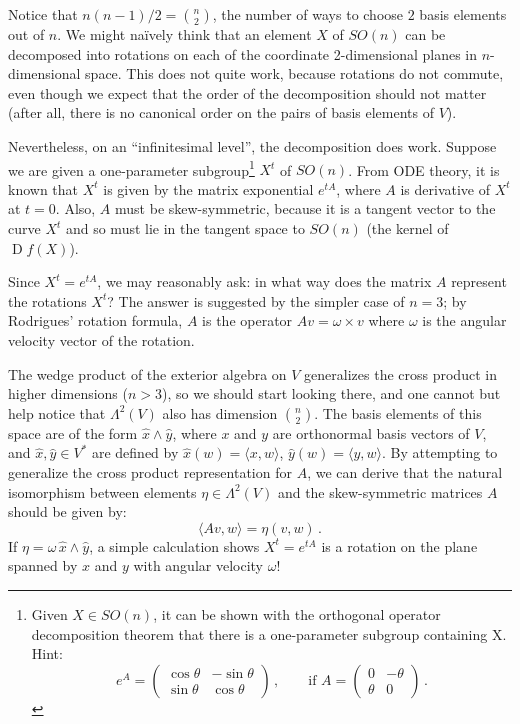 \documentclass[12pt]{article}
\DeclareMathOperator{\D}{D}
\begin{document}
Notice that $n(n-1)/2 = \binom{n}{2}$, the number of ways to choose $2$ basis elements out of $n$.
We might na\"ively think that an element $X$ of $SO(n)$ can be decomposed
into rotations on each of the coordinate 2-dimensional planes in $n$-dimensional space.
This does not quite work, because rotations do not commute, even though
we expect that the order of the decomposition should not matter (after all,
there is no canonical order on the pairs of basis elements of $V$).

Nevertheless, on an ``infinitesimal level'', the decomposition does work.
Suppose we are given a one-parameter subgroup\footnote{Given $X \in SO(n)$, it can be shown with the orthogonal operator decomposition theorem that there is a one-parameter subgroup containing X. Hint: 
\[
e^A = \begin{pmatrix}
\cos \theta & -\sin \theta \\
\sin \theta & \cos \theta
\end{pmatrix}\,,
\qquad \textrm{if } A = \begin{pmatrix}
0 & -\theta \\
\theta & 0
\end{pmatrix}\,.
\]
} $X^t$ of $SO(n)$.
From ODE theory,
it is known that $X^t$ is given by the matrix exponential $e^{tA}$,
where $A$ is derivative of $X^t$ at $t = 0$.
Also, $A$ must be skew-symmetric, because it is a tangent vector
to the curve $X^t$ and so must lie in the tangent space to $SO(n)$ (the kernel of $\D f(X)$).

Since $X^t = e^{tA}$, we may reasonably ask: in what way does the matrix $A$ represent
the rotations $X^t$?  The answer is suggested by the simpler case of $n=3$;
by Rodrigues' rotation formula, $A$ is the operator $A v = \omega \times v$
where $\omega$ is the angular velocity vector of the rotation.

The wedge product of the exterior algebra on $V$
generalizes the cross product in higher dimensions ($n>3$),
so we should start looking there,
and one cannot but help notice that $\Lambda^2(V)$ also has dimension $\binom{n}{2}$.
The basis elements of this space are of the form $\hat{x} \wedge \hat{y}$,
where $x$ and $y$ are orthonormal basis vectors of $V$, and $\hat{x}, \hat{y} \in V^*$
are defined by $\hat{x}(w) = \langle x, w\rangle$,
$\hat{y}(w) = \langle y, w\rangle$.  By attempting to generalize the cross product representation for $A$, we can derive that the natural isomorphism between elements $\eta \in \Lambda^2(V)$ and the skew-symmetric matrices $A$ should be given by:
\[
\langle Av, w \rangle = \eta(v, w)\,.
\]
If $\eta = \omega \, \hat{x} \wedge \hat{y}$, 
a simple calculation shows $X^t = e^{tA}$ is a rotation on the plane spanned by $x$ and $y$
with angular velocity $\omega$!
\end{document}
